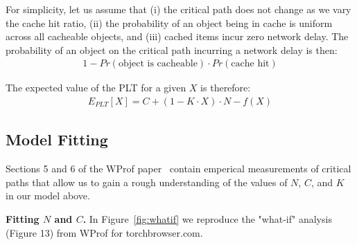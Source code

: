 For simplicity, let us assume that (i) the critical path does not change as we vary the cache hit
ratio, (ii) the probability of an object being in cache is uniform
across all cacheable objects, and (iii) cached items incur zero network delay. The probability of an object
on the critical path incurring a network delay is then:
\begin{align*}
1 - Pr(\text{object is cacheable}) \cdot Pr(\text{cache hit})
\end{align*}

The expected value of the PLT for a given $X$ is therefore:
\begin{align*}
E_{PLT}[X] = C + (1 - K \cdot X) \cdot N - f(X)
\end{align*}

\subsection{Model Fitting}
\label{subsec:model_fitting}

Sections 5 and 6 of the WProf paper~\cite{wang2013demystifying} contain
emperical measurements of critical paths that allow us to gain a rough
understanding of the values of $N$, $C$, and $K$ in our model
above.

{\bf Fitting $N$ and $C$.} In Figure~\ref{fig:whatif} we reproduce the "what-if" analysis (Figure 13) from
WProf for torchbrowser.com. 

